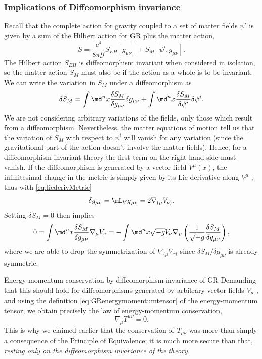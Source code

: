 \subsubsection{Implications of Diffeomorphism invariance}
Recall
that the complete action for gravity coupled to a set of matter fields $ψ^i$ is given by a sum of
the Hilbert action for GR plus the matter action,
\begin{equation}
S = \frac{c^4}{8 \pi \mathcal{G}} S_{EH} [g_{\mu \nu}] +S_M[\psi^i,g_{\mu \nu}].
\end{equation}
The Hilbert action $S_{EH}$ is diffeomorphism invariant when considered in isolation, so the matter
action $S_M$ must also be if the action as a whole is to be invariant. We can write the variation
in $S_M$ under a diffeomorphism as
\begin{equation}
\delta S_M =  \int \md^n x \frac{\delta S_M}{\delta g_{\mu \nu}} \delta g_{\mu \nu} + \int \md^n x \frac{\delta S_M}{\delta \psi^i} \delta \psi^i.
\end{equation}
We are not considering arbitrary variations of the fields, only those which result from a
diffeomorphism. Nevertheless, the matter equations of motion tell us that the variation of
$S_M$ with respect to $ψ^i$ will vanish for any variation (since the gravitational part of the action
doesn’t involve the matter fields). Hence, for a diffeomorphism invariant theory the first
term on the right hand side must vanish. If the diffeomorphism is generated by a
vector field $V^μ (x)$, the infinitesimal change in the metric is simply given by its Lie derivative
along $V^μ$ ; thus with \ref{eq:liederivMetric}
\begin{equation}
\delta g_{\mu \nu} = \mL_V g_{\mu \nu} = 2 \nabla_{(\mu} V_{\nu)} .
\end{equation}
Setting $\delta S_M=0$ then implies
\begin{equation}
0=\int \md^n x \frac{\delta S_M}{\delta g_{\mu \nu}} \nabla_\mu V_\nu = - \int \md^n x\sqrt{-g} V_\nu \nabla_\mu \left(\frac{1}{\sqrt{-g}} \frac{\delta S_M}{\delta g_{\mu \nu}}\right),
\end{equation}
where we are able to drop the symmetrization of $∇_{(μ} V_{ ν)}$ since $δS_M /δg_{μν}$ is already symmetric.\\
\begin{mybox}{Energy-momentum conservation by diffeomorphism invariance of GR}
	Demanding that this should hold for diffeomorphisms generated by arbitrary vector fields $V_μ$ , and
	using the definition \ref{eq:GRenergymomentumtensor} of the energy-momentum tensor, we obtain precisely the law of
	energy-momentum conservation,
	\begin{equation}
	\nabla_\mu T^{\mu \nu} =0.
	\end{equation}
	This is why we claimed earlier that the conservation of $T_{μν}$ was more than simply a consequence of the Principle of Equivalence; it is much more secure than that, \emph{resting only on the
		diffeomorphism invariance of the theory.}
	
\end{mybox}



